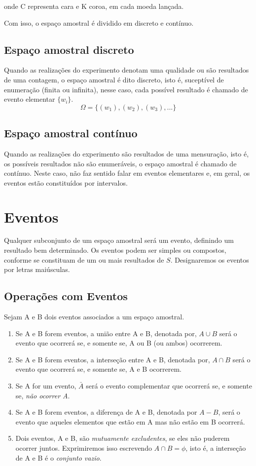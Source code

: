 \documentclass[a4paper,12pt]{report}
\begin{document}
{onde C representa cara e K coroa, em cada moeda
lançada.\vskip0.3cm

Com isso, o espaço amostral é dividido em discreto e contínuo.


\subsection{Espaço amostral discreto}

Quando as realizações do experimento denotam uma qualidade ou são
resultados de uma contagem, o espaço amostral é dito discreto,
isto é, suceptível de enumeração (finita ou infinita), nesse caso,
cada possível resultado é chamado de evento elementar $\{w_{i}\}$.
$$ \Omega = \{ (w_{1}),(w_{2}),(w_{3}),... \}  $$


\subsection{Espaço amostral contínuo}

Quando as realizações do experimento são resultados de uma
mensuração, isto é, os possíveis resultados não são enumeráveis, o
espaço amostral é chamado de contínuo. Neste caso, não faz sentido
falar em eventos elementares e, em geral, os eventos estão
constituídos por intervalos.


\section{Eventos}

Qualquer subconjunto de um espaço amostral será um evento,
definindo um resultado bem determinado. Os eventos podem ser
simples ou compostos, conforme se constituam de um ou mais
resultados de $S$. Designaremos os eventos por letras maiúsculas.


\subsection{Operações com Eventos}

Sejam A e B dois eventos associados a um espaço amostral.

\begin{enumerate}
    \item Se A e B forem eventos, a união entre A e B, denotada por, $A \cup B$ será o evento que
    ocorrerá se, e somente se, A ou B (ou ambos) ocorrerem.
    \item Se A e B forem eventos, a interseção entre A e B, denotada por, $A \cap B$ será o evento que
    ocorrerá se, e somente se, A e B ocorrerem.
    \item Se A for um evento, $\bar{A}$ será o evento complementar que ocorrerá
    se, e somente se, \emph{não ocorrer A}.
    \item Se A e B forem eventos, a diferença de A e B, denotada
    por $A-B$, será o evento que aqueles elementos que estão em A mas
    não estão em B ocorrerá.
    \item Dois eventos, A e B, são \emph{mutuamente excludentes}, se eles
    não puderem ocorrer juntos. Exprimiremos isso escrevendo $A \cap B =
    \phi$, isto é, a interseção de A e B é o \emph{conjunto vazio}.
\end{enumerate}


}
\end{document}
